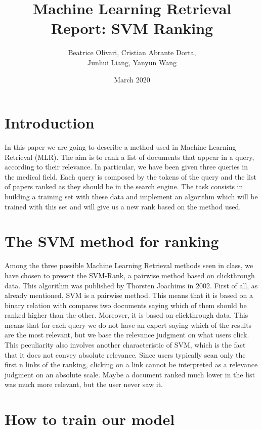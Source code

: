\documentclass{article}
\title{\Huge Machine Learning Retrieval Report: SVM Ranking\\}
\author{\Large Beatrice Olivari, Cristian Abrante Dorta,\\
\Large Junhui Liang, Yanyun Wang}
\date{March 2020}
\begin{document}
\maketitle

\section{Introduction}
In this paper we are going to describe a method used in Machine Learning Retrieval (MLR). The aim is to rank a list of documents that appear in a query, according to their relevance. In particular, we have been given three queries in the medical field. Each query is composed by the tokens of the query and the list of papers ranked as they should be in the search engine. The task consists in building a training set with these data and implement an algorithm which will be trained with this set and will give us a new rank based on the method used.

\section{The SVM method for ranking}
Among the three possible Machine Learning Retrieval methods seen in class, we have chosen to present the SVM-Rank, a pairwise method based on clickthrough data.
This algorithm was published by Thorsten Joachims in 2002.
First of all, as already mentioned, SVM is a pairwise method. This means that it is based on a binary relation with compares two documents saying which of them should be ranked higher than the other. 
Moreover, it is based on clickthrough data. This means that for each query we do not have an expert saying which of the results are the most relevant, but we base the relevance judgment on what users click. This peculiarity also involves another characteristic of SVM, which is the fact that it does not convey absolute relevance. Since users typically scan only the first n links of the ranking, clicking on a link cannot be interpreted as a relevance judgment on an absolute scale. Maybe a document ranked much lower in the list was much more relevant, but the user never saw it.

\section{How to train our model}
\end{document}

